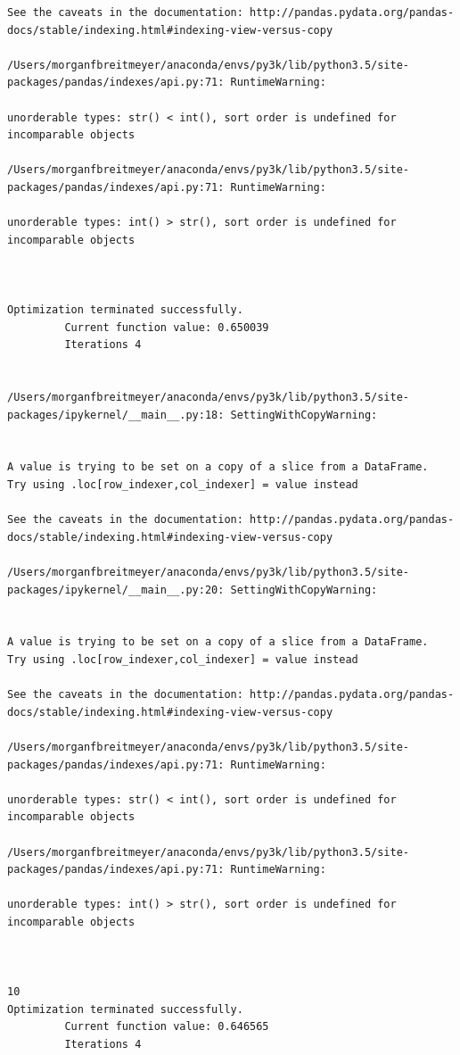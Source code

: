 \begin{lstlisting}
See the caveats in the documentation: http://pandas.pydata.org/pandas-docs/stable/indexing.html#indexing-view-versus-copy

/Users/morganfbreitmeyer/anaconda/envs/py3k/lib/python3.5/site-packages/pandas/indexes/api.py:71: RuntimeWarning:

unorderable types: str() < int(), sort order is undefined for incomparable objects

/Users/morganfbreitmeyer/anaconda/envs/py3k/lib/python3.5/site-packages/pandas/indexes/api.py:71: RuntimeWarning:

unorderable types: int() > str(), sort order is undefined for incomparable objects



Optimization terminated successfully.
         Current function value: 0.650039
         Iterations 4


/Users/morganfbreitmeyer/anaconda/envs/py3k/lib/python3.5/site-packages/ipykernel/__main__.py:18: SettingWithCopyWarning:


A value is trying to be set on a copy of a slice from a DataFrame.
Try using .loc[row_indexer,col_indexer] = value instead

See the caveats in the documentation: http://pandas.pydata.org/pandas-docs/stable/indexing.html#indexing-view-versus-copy

/Users/morganfbreitmeyer/anaconda/envs/py3k/lib/python3.5/site-packages/ipykernel/__main__.py:20: SettingWithCopyWarning:


A value is trying to be set on a copy of a slice from a DataFrame.
Try using .loc[row_indexer,col_indexer] = value instead

See the caveats in the documentation: http://pandas.pydata.org/pandas-docs/stable/indexing.html#indexing-view-versus-copy

/Users/morganfbreitmeyer/anaconda/envs/py3k/lib/python3.5/site-packages/pandas/indexes/api.py:71: RuntimeWarning:

unorderable types: str() < int(), sort order is undefined for incomparable objects

/Users/morganfbreitmeyer/anaconda/envs/py3k/lib/python3.5/site-packages/pandas/indexes/api.py:71: RuntimeWarning:

unorderable types: int() > str(), sort order is undefined for incomparable objects



10
Optimization terminated successfully.
         Current function value: 0.646565
         Iterations 4



\end{lstlisting}
